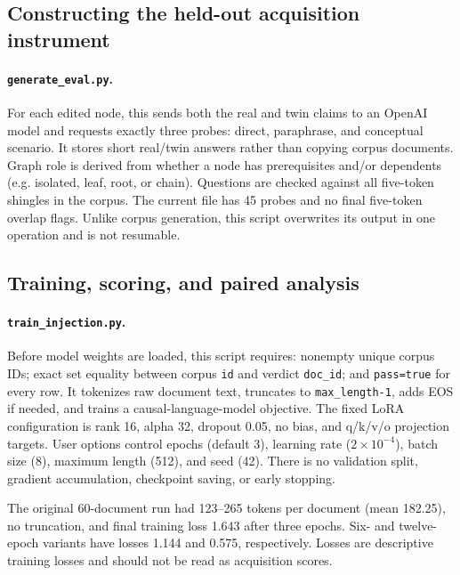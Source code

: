 \documentclass[11pt]{article}
\begin{document}
\subsection{Constructing the held-out acquisition instrument}

\paragraph{\texttt{generate\_eval.py}.}
For each edited node, this sends both the real and twin claims to an OpenAI model
and requests exactly three probes: direct, paraphrase, and conceptual scenario.
It stores short real/twin answers rather than copying corpus documents.  Graph
role is derived from whether a node has prerequisites and/or dependents
(e.g. isolated, leaf, root, or chain).  Questions are checked against all
five-token shingles in the corpus.  The current file has 45 probes and no final
five-token overlap flags.  Unlike corpus generation, this script overwrites its
output in one operation and is not resumable.

\subsection{Training, scoring, and paired analysis}

\paragraph{\texttt{train\_injection.py}.}
Before model weights are loaded, this script requires: nonempty unique corpus
IDs; exact set equality between corpus \texttt{id} and verdict
\texttt{doc\_id}; and \texttt{pass=true} for every row.  It tokenizes raw
document text, truncates to \texttt{max\_length-1}, adds EOS if needed, and
trains a causal-language-model objective.  The fixed LoRA configuration is rank
16, alpha 32, dropout 0.05, no bias, and q/k/v/o projection targets.  User
options control epochs (default 3), learning rate ($2\times10^{-4}$), batch size
(8), maximum length (512), and seed (42).  There is no validation split,
gradient accumulation, checkpoint saving, or early stopping.

The original 60-document run had 123--265 tokens per document (mean 182.25), no
truncation, and final training loss 1.643 after three epochs.  Six- and
twelve-epoch variants have losses 1.144 and 0.575, respectively.  Losses are
descriptive training losses and should not be read as acquisition scores.
\end{document}
